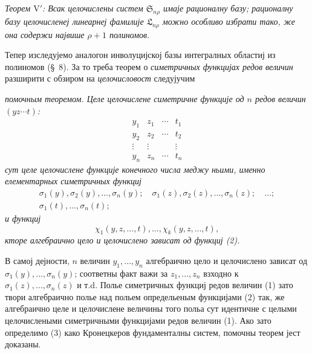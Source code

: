 ﻿\documentclass[11pt]{article}
\providecommand{\Ssys}{\mathfrak{S}}
\providecommand{\Lsys}{\mathfrak{L}}
\begin{document}
{\itshape Теорем $\mathrm{V}'$: Всак целочислены систем $\Ssys_{n\rho}$ имаје рационалну базу; рационалну базу целочисленеј линеарнеј фамилије $\Lsys_{n\rho}$ можно особливо избрати тако, же она содержи највише $\rho+1$ полиномов.}

Тепер изследујемо аналогон инволуцијској базы интегралных областиј из полиномов (\S\ 8). За то треба теорем о {\itshape симетричных функцијах редов величин} разширити с обзиром на {\itshape целочисловост} следујучим

{\itshape помочным теоремом. Целе целочислене симетричне функције од $n$ редов величин $(yz\cdots t)$:}
\begin{equation}
\begin{array}{cccc}
  y_1&z_1&\cdots&t_1\\
  y_2&z_2&\cdots&t_2\\
  \vdots&\vdots&&\vdots\\
  y_n&z_n&\cdots&t_n
\end{array}
\tag{1}
\end{equation}
{\itshape сут целе целочислене функције конечного числа меджу ньими, именно елементарных симетричных функциј}
\begin{equation}
\begin{gathered}
  \sigma_1(y),\sigma_2(y),\ldots,\sigma_n(y);\quad
  \sigma_1(z),\sigma_2(z),\ldots,\sigma_n(z);\quad\ldots;\\
  \sigma_1(t),\ldots,\sigma_n(t);
\end{gathered}
\tag{2}
\end{equation}
{\itshape и функциј}
\begin{equation}
  \chi_1(y,z,\ldots,t),\ldots,\chi_k(y,z,\ldots,t),
\tag{3}
\end{equation}
{\itshape кторе алгебраично цело и целочислено зависат од функциј (2).}

В самој дејности, $n$ величин $y_1,\ldots,y_n$ алгебраично цело и целочислено зависат од $\sigma_1(y),\ldots,\sigma_n(y)$; соответны факт важи за $z_1,\ldots,z_n$ взходно к $\sigma_1(z),\ldots,\sigma_n(z)$ и т.d. Полье симетричных функциј редов величин (1) зато твори алгебраично полье над польем определьеным функцијами (2) так, же алгебраично целе и целочислене величины того польа сут идентичне с целыми целочислеными симетричными функцијами редов величин (1). Ако зато определимо (3) како Кронецкеров фундаменталны систем, помочны теорем јест доказаны.
\end{document}
